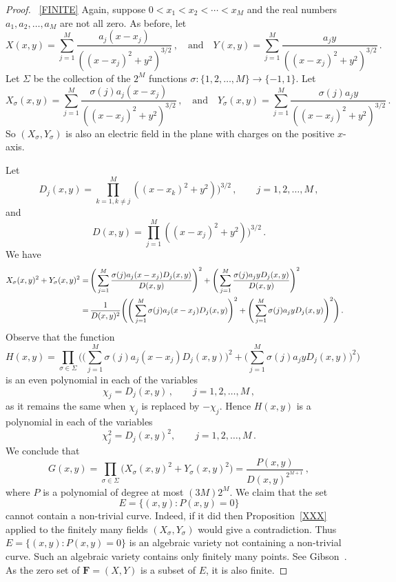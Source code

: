 \documentclass{article}
\theoremstyle{remark}
\numberwithin{equation}{section}
\begin{document}
\begin{proof}~\ref{FINITE} Again, suppose $0 < x_1 < x_2 < \cdots < x_M$ and the real numbers $a_1, a_2, \ldots, a_M$ are not all zero.
As before, let 
$$X(x,y) = \sum_{j=1}^M{\frac{a_j(x-x_j)}{((x-x_j)^2 + y^2)^{3/2}}}\,, \quad \text{and} 
\quad  Y(x,y) = \sum_{j=1}^M{\frac{a_jy}{((x-x_j)^2 + y^2)^{3/2}}}\,.$$
Let $\Sigma$ be the collection of the $2^M$ functions $\sigma: \{1,2,\ldots,M\} \rightarrow \{-1,1\}$.
Let 
$$X_{\sigma}(x,y) = \sum_{j=1}^M{\frac{\sigma(j)a_j(x-x_j)}{((x-x_j)^2 + y^2)^{3/2}}}\,, \quad \text{and} 
\quad Y_{\sigma}(x,y) = \sum_{j=1}^M{\frac{\sigma(j)a_jy}{((x-x_j)^2 + y^2)^{3/2}}}\,.$$ 
So $(X_{\sigma},Y_{\sigma})$ is also an electric field in the plane with charges on the positive $x$-axis.

Let
$$D_j(x,y) = \prod_{k=1, k \neq j}^M{((x-x_k)^2 + y^2))^{3/2}}\,, \qquad j=1,2,\ldots,M\,,$$
and
$$D(x,y) = \prod_{j=1}^M{((x-x_j)^2 + y^2))^{3/2}}\,.$$
We have
\begin{equation} \notag \begin{split}
X_{\sigma}(x,y)^2 + Y_{\sigma}(x,y)^2 = & \, \Bigg( \sum_{j=1}^M{\frac{\sigma(j)a_j(x-x_j)D_j(x,y)}{D(x,y)}} \Bigg)^2 
+ \Bigg( \sum_{j=1}^M{\frac{\sigma(j)a_jyD_j(x,y)}{D(x,y)}} \Bigg)^2 \cr   
= & \, \frac{1}{D(x,y)^2} \Bigg( \Bigg( \sum_{j=1}^M{\sigma(j)a_j(x-x_j)D_j(x,y)} \Bigg)^2 
+ \Bigg( \sum_{j=1}^M{\sigma(j)a_jyD_j(x,y)} \Bigg)^2 \Bigg)\,. \cr
\end{split} \end{equation} 
Observe that the function 
$$H(x,y) = \prod_{\sigma \in \Sigma}{\Bigg( \Bigg( \sum_{j=1}^M{\sigma(j)a_j(x-x_j)D_j(x,y)} \Bigg)^2 
+ \Bigg( \sum_{j=1}^M{\sigma(j)a_jyD_j(x,y)} \Bigg)^2 \Bigg)}$$
is an even polynomial in each of the variables 
$$\chi_j = D_j(x,y)\,, \qquad j=1,2,\ldots,M\,,$$ 
as it remains the same when $\chi_j$ is replaced by $-\chi_j$. Hence $H(x,y)$ is a polynomial in each of the variables 
$$\chi_j^2 = D_j(x,y)^2, \qquad j=1,2,\ldots,M\,.$$ 
We conclude that 
$$G(x,y) = \prod_{\sigma \in \Sigma}{\Bigg( X_{\sigma}(x,y)^2 + Y_{\sigma}(x,y)^2 \Bigg)} =  \frac{P(x,y)}{D(x,y)^{2^{M+1}}}\,,$$
where $P$ is a polynomial of degree at most $(3M)2^M$.  
We claim that the set 
$$E = \{(x,y): P(x,y) = 0\}$$ 
cannot contain a non-trivial curve. Indeed, if it did then Proposition~\ref{XXX} applied to the finitely many fields $(X_\sigma,Y_\sigma)$ would give a contradiction.
Thus $E = \{(x,y): P(x,y) = 0\}$ is an algebraic variety not containing a non-trivial curve. 
Such an algebraic variety contains only finitely many points.  See Gibson~\cite{Gibson}.   As the zero set of ${\mathbf F}=(X,Y)$ is a 
subset of $E$, it is also finite. 
\end{proof}
\end{document}
